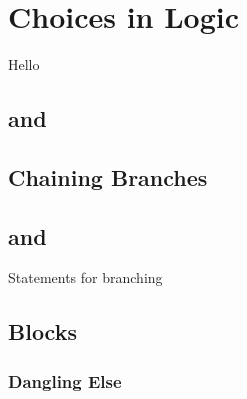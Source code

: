 \section{Choices in Logic}
\label{sec:flow:branch}

Hello

\subsection{ and }

\subsection{}

\subsection{Chaining Branches}



\csharpsubsubsection{\csharp}

\subsection{ and }

\csharpsubsection{\csharp}

\begin{syntaxfloat}
  
  \caption{Statements for branching}
  \label{syntax:flow:branch}
\end{syntaxfloat}



\subsection{Blocks}


\subsubsection{Dangling Else}
\label{sec:flow:branch:danglingelse}



